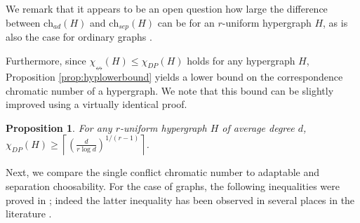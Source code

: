 \documentclass[12pt]{article}
\newtheorem{proposition}[theorem]{Proposition}
\newcommand{\single}{\chi_{\nleftrightarrow}}
\newcommand{\ch}{\mathrm{ch}}
\newcommand{\1}{\mathds{1}}
\begin{document}
We remark that 
it appears to be an open question how large the difference between $\ch_{ad}(H)$ and $\ch_{sep}(H)$ can be
for an $r$-uniform hypergraph $H$, as is also the case for ordinary graphs \cite{CasselgrenEriksson}.

Furthermore, since  $\single(H) \leq \chi_{DP}(H)$ holds for any hypergraph $H$, 
Proposition \ref{prop:hyplowerbound}
yields a lower bound on the correspondence chromatic number of a hypergraph. 
We note that
this bound can be slightly improved using a virtually identical proof.

\begin{proposition}
	For any $r$-uniform hypergraph $H$ of average degree $d$,
	$\chi_{DP}(H) \geq \left\lceil \left(\frac{d}{r \log d}\right)^{1/(r-1)}\right\rceil$.
\end{proposition}


	Next, we compare the single conflict chromatic number to adaptable and separation choosability.
	For the case of graphs, the following inequalities were proved in \cite{DvorakEsperetKangOzeki};
	indeed the latter inequality has been
	observed in several places in the literature 
	\cite{EsperetKangThomasse, CasselgrenGranholmRaspaud, DvorakEsperetKangOzeki}.
\end{document}

